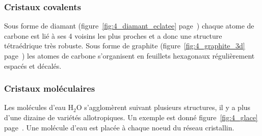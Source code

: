 \subsubsection*{Cristaux covalents}
\begin{ex}[Carbone]
    Sous forme de diamant (figure~\ref{fig:4_diamant_eclatee}
    page~\pageref{fig:4_diamant_eclatee}) chaque atome de
    carbone est lié à ses 4 voisins les plus proches et a donc une
    structure tétraédrique très robuste.
    Sous forme de graphite (figure~\ref{fig:4_graphite_3d}
    page~\pageref{fig:4_graphite_3d}) les atomes de
    carbone s'organisent en feuillets hexagonaux régulièrement
    espacés et décalés.
\end{ex}


\subsubsection*{Cristaux moléculaires}
\begin{ex}[Eau]
    Les molécules d'eau H$_2$O s'agglomèrent suivant plusieurs structures,
    il y a plus d'une dizaine de variétés allotropiques.
    Un exemple
    est donné figure~\ref{fig:4_glace} page~\pageref{fig:4_glace}. Une molécule d'eau est placée
    à chaque noeud du réseau cristallin.
\end{ex}
